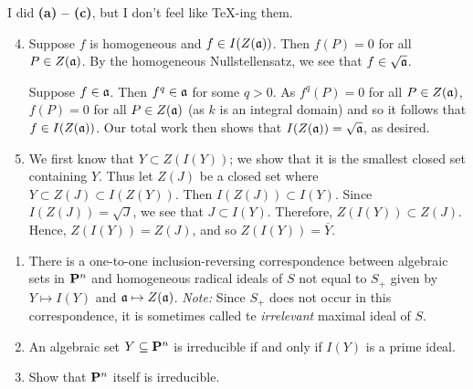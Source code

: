 \documentclass[10pt]{amsart}
\begin{document}
\begin{solution}
    \begin{luke}
        I did {\bf (a) -- (c)}, but I don't feel like \TeX-ing them.
        \begin{enumerate}
            \setcounter{enumi}{3}
            \item Suppose $f$ is homogeneous and $f \in I(Z(\mathfrak{a}))$. Then 
            $f(P) = 0$ for all $P \in Z(\mathfrak{a})$. By the homogeneous Nullstellensatz, 
            we see that $f \in \sqrt{\mathfrak{a}}$.
            
            Suppose $f \in \mathfrak{a}$. Then $f^q \in \mathfrak{a}$ for some $q > 0$. 
            As $f^q(P) = 0$ for all $P \in Z(\mathfrak{a})$, $f(P) = 0$ for all 
            $P \in Z(\mathfrak{a})$ (as $k$ is an integral domain) and so it 
            follows that $f \in I(Z(\mathfrak{a}))$.
            Our total work then shows that $I(Z(\mathfrak{a})) = \sqrt{\mathfrak{a}}$, as desired.
    
            \item
            We first know that $Y \subset Z(I(Y))$; we show that it is the smallest closed 
            set containing $Y$. Thus
            let $Z(J)$ be a closed set where $Y \subset Z(J) \subset I(Z(Y))$. 
            Then $I(Z(J)) \subset I(Y)$. Since $I(Z(J)) = \sqrt{J}$, we see that 
            $J \subset I(Y)$. Therefore, 
            $Z(I(Y)) \subset Z(J)$. Hence, $Z(I(Y)) = Z(J)$, and so $Z(I(Y)) = \overline{Y}$.  
        \end{enumerate}
    \end{luke}
\end{solution}

\begin{exercise}[Exercise 2.4]
    \begin{enumerate}
        \item There is a one-to-one inclusion-reversing correspondence between
        algebraic sets in ${\bf P}^n$ and homogeneous radical ideals of $S$ not equal
        to $S_+$ given by $Y \mapsto I(Y)$ and $\mathfrak{a} \mapsto
        Z(\mathfrak{a})$. \emph{Note:} Since $S_{+}$ does not occur in this correspondence, 
        it is sometimes called te \emph{irrelevant} maximal ideal of $S$. 
        
        \item An algebraic set $Y \subseteq {\bf P}^n$ is irreducible if and only if $I(Y)$ is a prime ideal. 
        \item Show that ${\bf P}^n$ itself is irreducible. 
    \end{enumerate}
\end{exercise}
\end{document}
